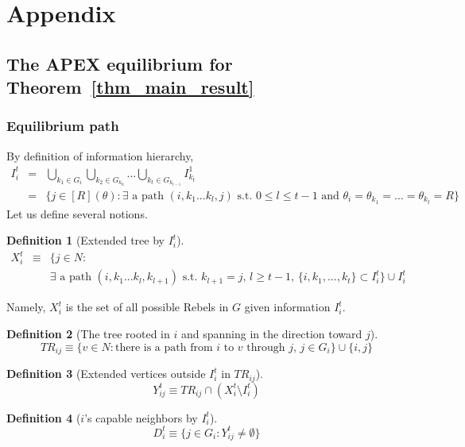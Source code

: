 \documentclass[12pt,letter]{article}
\newtheorem{definition}{Definition}[section]
\theoremstyle{definition}
\theoremstyle{remark}
\theoremstyle{claim}
\begin{document}


\appendix
\section{Appendix}
\subsection{The APEX equilibrium for Theorem~\ref{thm_main_result}}
\subsubsection{Equilibrium path}
\label{sec:equilibrium_path}
By definition of information hierarchy, 
\begin{eqnarray*}
I^t_i & = & \bigcup_{k_1\in G_i}\bigcup_{k_2\in G_{k_0}}...\bigcup_{k_{t}\in G_{k_{t-1}}}I^1_{k_{t}}\\
&= & \{j\in [R](\theta): \text{$\exists$ a path $(i,k_1...k_{l},j)$ s.t.~$0\leq l\leq t-1$ and $\theta_i=\theta_{k_1}=...=\theta_{k_l}=R$}\}
\end{eqnarray*}
Let us define several notions.
\begin{definition}[Extended tree by $I^t_i$]
\label{def:ext_tree}
\begin{eqnarray*}
X^t_i & \equiv &  \{j\in N: \\
	& & \text{$\exists$ a path $(i,k_1...k_{l},k_{l+1})$ s.t.~$k_{l+1}=j$, $l\geq t-1$, $\{i,k_1,...,k_{t}\}\subset I^t_i$}\}\cup I^t_i
\end{eqnarray*}
\end{definition}
Namely, $X^t_i $ is the set of all possible Rebels in $G$ given information $I^t_i$. 

\begin{definition}[The tree rooted in $i$ and spanning in the direction toward $j$]
\[TR_{ij}\equiv \{v\in N:\text{there is a path from $i$ to $v$ through $j$, $j\in G_i$}\}\cup\{i,j\}\]
\end{definition}


\begin{definition}[Extended vertices outside $I^t_i$ in $TR_{ij}$]
\[Y^t_{ij}\equiv TR_{ij}\cap(X^t_i\setminus I^t_i)\]
\end{definition}


\begin{definition}[$i$'s capable neighbors by $I^t_i$]
\[D^t_{i}\equiv \{j\in G_i: Y^t_{ij}\neq \emptyset\}\]
\end{definition}
\end{document}
